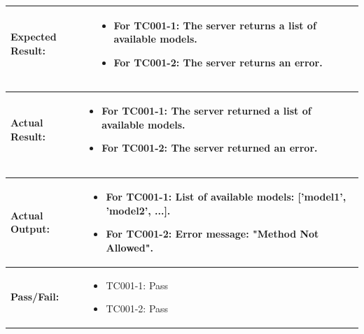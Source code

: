 \noindent
\begin{tabularx}{\textwidth}{|>{\raggedright\arraybackslash}p{4cm}|X|}
    \hline
    \textbf{Expected Result:} & 
    \begin{itemize}
        \item For TC001-1: The server returns a list of available models.
        \item For TC001-2: The server returns an error.
    \end{itemize}
    \\ \hline
\end{tabularx}

\noindent
\begin{tabularx}{\textwidth}{|>{\raggedright\arraybackslash}p{4cm}|X|}
    \hline
    \textbf{Actual Result:} & 
    \begin{itemize}
        \item For TC001-1: The server returned a list of available models.
        \item For TC001-2: The server returned an error.
    \end{itemize}
    \\ \hline
\end{tabularx}

\noindent
\begin{tabularx}{\textwidth}{|>{\raggedright\arraybackslash}p{4cm}|X|}
    \hline
    \textbf{Actual Output:} & 
    \begin{itemize}
        \item For TC001-1: List of available models: ['model1', 'model2', ...].
        \item For TC001-2: Error message: "Method Not Allowed".
    \end{itemize}
    \\ \hline
    \textbf{Pass/Fail:} & 
    \begin{itemize}
        \item TC001-1: Pass
        \item TC001-2: Pass
    \end{itemize}
    \\ \hline
\end{tabularx}
\\\\

